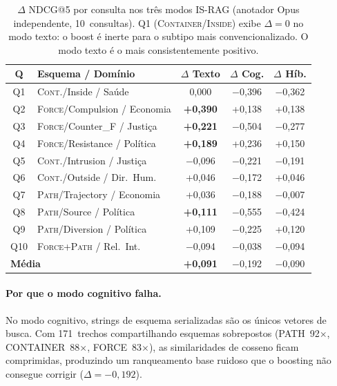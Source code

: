\documentclass[11pt,a4paper]{article}
\begin{document}
\begin{table}[H]
\centering
\small
\setlength{\tabcolsep}{4pt}
\begin{tabular}{clccc}
\toprule
\textbf{Q} & \textbf{Esquema / Domínio} & \textbf{$\Delta$ Texto} & \textbf{$\Delta$ Cog.} & \textbf{$\Delta$ Híb.} \\
\midrule
Q1  & \textsc{Cont.}/Inside / Saúde             & 0,000           & $-$0,396        & $-$0,362 \\
Q2  & \textsc{Force}/Compulsion / Economia     & \textbf{+0,390} & +0,138          & +0,138 \\
Q3  & \textsc{Force}/Counter\_F / Justiça      & \textbf{+0,221} & $-$0,504        & $-$0,277 \\
Q4  & \textsc{Force}/Resistance / Política     & \textbf{+0,189} & +0,236          & +0,150 \\
\midrule
Q5  & \textsc{Cont.}/Intrusion / Justiça       & $-$0,096        & $-$0,221        & $-$0,191 \\
Q6  & \textsc{Cont.}/Outside / Dir.\ Hum.      & +0,046          & $-$0,172        & +0,046 \\
\midrule
Q7  & \textsc{Path}/Trajectory / Economia      & +0,036          & $-$0,188        & $-$0,007 \\
Q8  & \textsc{Path}/Source / Política          & \textbf{+0,111} & $-$0,555        & $-$0,424 \\
Q9  & \textsc{Path}/Diversion / Política       & +0,109          & $-$0,225        & +0,120 \\
\midrule
Q10 & \textsc{Force+Path} / Rel.\ Int.          & $-$0,094        & $-$0,038        & $-$0,094 \\
\midrule
\multicolumn{2}{l}{\textbf{Média}} & \textbf{+0,091} & $-$0,192 & $-$0,090 \\
\bottomrule
\end{tabular}
\caption{$\Delta$ NDCG@5 por consulta nos três modos IS-RAG
  (anotador Opus independente, 10~consultas).
  Q1 (\textsc{Container}/\textsc{Inside}) exibe $\Delta{=}0$ no modo
  texto: o boost é inerte para o subtipo mais convencionalizado.
  O modo texto é o mais consistentemente positivo.}
\label{tab:modes_compare}
\end{table}

\paragraph{Por que o modo cognitivo falha.}
No modo cognitivo, strings de esquema serializadas são os únicos
vetores de busca.
Com 171~trechos compartilhando esquemas sobrepostos
(PATH~92$\times$, CONTAINER~88$\times$, FORCE~83$\times$), as
similaridades de cosseno ficam comprimidas, produzindo um ranqueamento
base ruidoso que o boosting não consegue corrigir
($\Delta = -0{,}192$).
\end{document}
